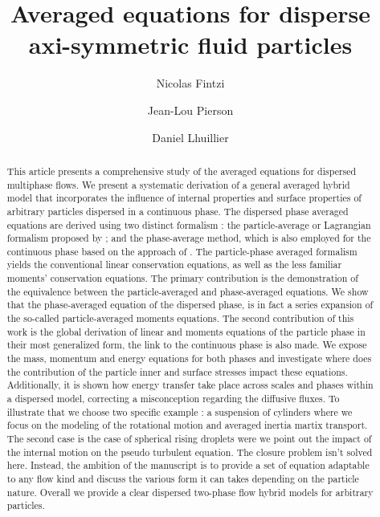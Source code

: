 \documentclass[11pt]{My_preprint}
\title{Averaged equations for disperse axi-symmetric fluid particles }
\author[1,2]{Nicolas Fintzi}
\author[1]{Jean-Lou Pierson}
\author[2]{Daniel Lhuillier}
\affil[1]{IFP Energies Nouvelles, Rond-point de l’changeur de Solaize, 69360 Solaize}
\affil[2]{Sorbonne Université, Institut Jean le Rond ∂’Alembert, 4 place Jussieu, 75252 PARIS CEDEX 05, France}
\begin{document}
\maketitle

\begin{abstract}
    This article presents a comprehensive study of the averaged equations for dispersed multiphase flows.
    We present a systematic derivation of a general averaged hybrid model that incorporates the influence of internal properties and surface properties of arbitrary particles dispersed in a continuous phase.
    The dispersed phase averaged equations are derived using two distinct formalism :
    the particle-average or Lagrangian formalism proposed by \citet{zhang1994ensemble,jackson1997locally};
    and the phase-average method, which is also employed for the continuous phase based on the approach of \citet{drew1983mathematical}. 
    The particle-phase averaged formalism yields the conventional linear conservation equations, as well as the less familiar moments' conservation equations.
    The primary contribution is the demonstration of the equivalence between the particle-averaged and phase-averaged equations. 
    We show that the phase-averaged equation of the dispersed phase, is in fact a series expansion of the so-called particle-averaged moments equations. 
    The second contribution of this work is the global derivation of linear and moments equations of the particle phase in their most generalized form, the link to the continuous phase is also made. 
    We expose the mass, momentum and energy equations for both phases and investigate where does the contribution of the particle inner and surface stresses impact these equations. 
    Additionally, it is shown how energy transfer take place across scales and phases within a dispersed model, correcting a misconception regarding the diffusive fluxes. 
    To illustrate that we choose two specific example : a suspension of cylinders where we focus on the modeling of the rotational motion and averaged inertia martix transport. 
    The second case is the case of spherical rising droplets were we point out the impact of the internal motion on the pseudo turbulent equation. 
    The closure problem isn't solved here. 
    Instead, the ambition of the manuscript is to provide a set of equation adaptable to any flow kind and discuss the various form it can takes depending on the particle nature. 
    Overall we provide a clear dispersed two-phase flow hybrid models for arbitrary particles. 
\end{abstract}
\end{document}
